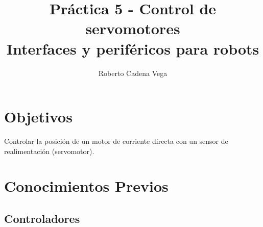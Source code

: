 
\title{Práctica 5 - Control de servomotores\\Interfaces y periféricos para robots}
\author{Roberto Cadena Vega} %
\date{}

\maketitle %
\section{Objetivos}

	Controlar la posición de un motor de corriente directa con un sensor de realimentación (servomotor).
\section{Conocimientos Previos}
	\subsection{Controladores}

